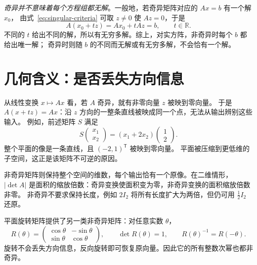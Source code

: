 \documentclass[UTF8,12pt,a4paper,fontset=fandol]{ctexart}
\begin{document}
\emph{奇异并不意味着每个方程组都无解}。一般地，若奇异矩阵对应的 $Ax=b$ 有一个解 $x_0$，
由式~\eqref{eq:singular-criteria} 可取 $z\ne0$ 使 $Az=0$，于是
\[
  A(x_0+tz)=Ax_0+tAz=b,\qquad t\in\mathbb R.
\]
不同的 $t$ 给出不同的解，所以有无穷多解。综上，对实方阵，非奇异时每个 $b$ 都给出唯一解；
奇异时则随 $b$ 的不同而无解或有无穷多解，不会恰有一个解。

\section{几何含义：是否丢失方向信息}

从线性变换 $x\mapsto Ax$ 看，若 $A$ 奇异，就有非零向量 $z$ 被映到零向量。
于是 $A(x+tz)=Ax$：沿 $z$ 方向的一整条直线被映成同一个点，无法从输出辨别这些输入。
例如，前述矩阵 $S$ 满足
\[
  S\begin{pmatrix}x_1\\x_2\end{pmatrix}
  =(x_1+2x_2)\begin{pmatrix}1\\2\end{pmatrix}.
\]
整个平面的像是一条直线，且 $(-2,1)^{\mathsf T}$ 被映到零向量。
平面被压缩到更低维的子空间，这正是该矩阵不可逆的原因。

非奇异矩阵则保持整个空间的维数，每个输出恰有一个原像。在二维情形，
$|\det A|$ 是面积的缩放倍数：奇异变换使面积变为零，非奇异变换的面积缩放倍数非零。
非奇异不要求保持长度，例如 $2I_2$ 将所有长度扩大为两倍，但仍可用 $\tfrac12 I_2$ 还原。

平面旋转矩阵提供了另一类非奇异矩阵：对任意实数 $\theta$，
\[
  R(\theta)=\begin{pmatrix}\cos\theta&-\sin\theta\\\sin\theta&\cos\theta\end{pmatrix},
  \qquad \det R(\theta)=1,\qquad R(\theta)^{-1}=R(-\theta).
\]
旋转不会丢失方向信息，反向旋转即可恢复原向量。因此它的所有整数次幂也都非奇异。
\end{document}
